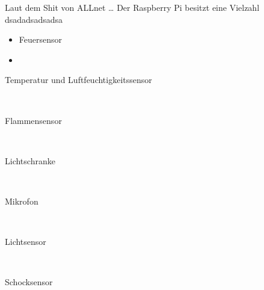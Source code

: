 
Laut dem Shit von ALLnet \cite{111861pd90} \ldots
Der Raspberry Pi besitzt eine Vielzahl  dsadadsadsadsa
\begin{itemize}
\item Feuersensor
\item
\end{itemize}

\begin{description}
\item[Temperatur und Luftfeuchtigkeitssensor] \hfill \\
	
\item[Flammensensor]\hfill \\
\item[Lichtschranke]\hfill \\
\item[Mikrofon]\hfill \\
\item[Lichtsensor]\hfill \\
\item[Schocksensor]\hfill \\
\end{description}